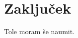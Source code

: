 \documentclass[isrm2, tisk]{fmfdelo}
\begin{document}
    \section{Zaključek}
    Tole moram še naumit.
%
%
%
%
\end{document}
